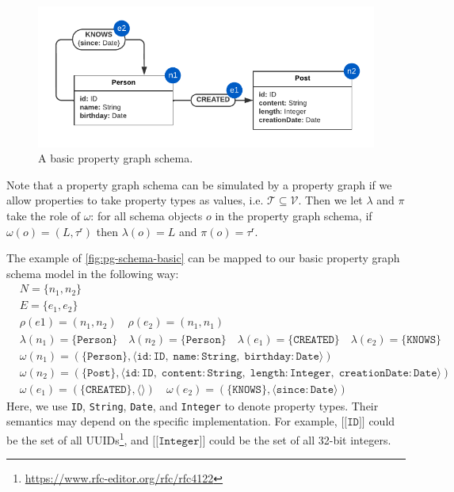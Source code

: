 \documentclass{report}
\theoremstyle{definition}
\newcommand{\ptypes}{\mathcal{T}}
\newcommand{\rtype}{\tau^\mathsf{r}}
\newcommand{\lsem}{\ensuremath{[\![}}
\newcommand{\rsem}{\ensuremath{]\!]}}
\newcommand{\sem}[1]{\ensuremath{\lsem #1 \rsem}}
\begin{document}
\begin{figure}[t]
  \centering
  \includegraphics{figures/pg-schema-basic.pdf}
  \caption{A basic property graph schema.}
  \label{fig:pg-schema-basic}
\end{figure}

Note that a property graph schema can be simulated by a property graph if we allow properties to take property types as values, i.e. $\ptypes \subseteq \mathcal{V}$. Then we let $\lambda$ and $\pi$ take the role of $\omega$: for all schema objects $o$ in the property graph schema, if $\omega(o) = (L, \rtype)$ then $\lambda(o) = L$ and $\pi(o) = \rtype$.

The example of \autoref{fig:pg-schema-basic} can be mapped to our basic property graph schema model in the following way:
\begin{align*}
  &N = \{n_1, n_2\}\\
  &E = \{e_1, e_2\}\\
  &\rho(e1) = (n_1, n_2) \quad \rho(e_2) = (n_1, n_1)\\
  &\lambda(n_1) = \{\texttt{Person}\} \quad \lambda(n_2) = \{\texttt{Person}\} \quad \lambda(e_1) = \{\texttt{CREATED}\} \quad \lambda(e_2) = \{\texttt{KNOWS}\}\\
  &\omega(n_1) = (\{\texttt{Person}\}, \langle \texttt{id} : \texttt{ID},\;\texttt{name} : \texttt{String},\;\texttt{birthday} : \texttt{Date} \rangle)\\
  &\omega(n_2) = (\{\texttt{Post}\}, \langle \texttt{id} : \texttt{ID},\;\texttt{content} : \texttt{String},\;\texttt{length} : \texttt{Integer},\;\texttt{creationDate} : \texttt{Date} \rangle)\\
  &\omega(e_1) = (\{\texttt{CREATED}\}, \langle\rangle) \quad \omega(e_2) = (\{\texttt{KNOWS}\}, \langle \texttt{since} : \texttt{Date} \rangle)
\end{align*}
Here, we use \texttt{ID}, \texttt{String}, \texttt{Date}, and \texttt{Integer} to denote property types. Their semantics may depend on the specific implementation. For example, $\sem{\texttt{ID}}$ could be the set of all UUIDs\footnote{\url{https://www.rfc-editor.org/rfc/rfc4122}}, and $\sem{\texttt{Integer}}$ could be the set of all 32-bit integers.
\end{document}
